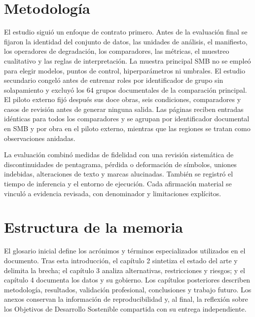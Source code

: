 \section{Metodología}
El estudio siguió un enfoque de contrato primero. Antes de la evaluación final se fijaron la identidad
del conjunto de datos, las unidades de análisis, el manifiesto, los operadores de degradación,
los comparadores, las métricas, el muestreo cualitativo y las reglas de interpretación. La muestra
principal SMB no se empleó para elegir modelos, puntos de control, hiperparámetros ni umbrales. El
estudio secundario congeló antes de entrenar roles por identificador de grupo sin solapamiento y excluyó los 64 grupos documentales
de la comparación principal. El piloto externo fijó después sus doce obras, seis condiciones,
comparadores y casos de revisión antes de generar ninguna salida. Las páginas reciben entradas
idénticas para todos los comparadores y se agrupan por identificador documental en SMB y por obra en el piloto externo, mientras que las
regiones se tratan como observaciones anidadas.

La evaluación combinó medidas de fidelidad con una revisión sistemática de discontinuidades de
pentagrama, pérdida o deformación de símbolos, uniones indebidas, alteraciones de texto y marcas
alucinadas. También se registró el tiempo de inferencia y el entorno de ejecución. Cada afirmación
material se vinculó a evidencia revisada, con denominador y limitaciones explícitos.

\section{Estructura de la memoria}
El glosario inicial define los acrónimos y términos especializados utilizados en el documento.
Tras esta introducción, el capítulo 2 sintetiza el estado del arte y delimita la brecha; el capítulo
3 analiza alternativas, restricciones y riesgos; y el capítulo 4 documenta los datos y su gobierno.
Los capítulos posteriores describen metodología, resultados, validación profesional, conclusiones
y trabajo futuro. Los anexos conservan la información de reproducibilidad y, al final, la
reflexión sobre los Objetivos de Desarrollo Sostenible compartida con su entrega independiente.
